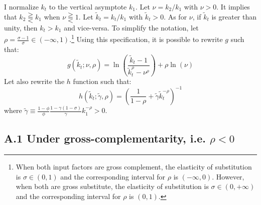 I normalize $k_t$ to the vertical asymptote $k_1$. Let $\nu = k_2/k_1$ with $\nu > 0$. It implies that $k_2 \gtreqqless k_1$ when $\nu \gtreqqless 1$. Let $\tilde{k}_t = k_t / k_1$ with $\tilde{k}_t > 0$. As for $\nu$, if $\tilde{k}_t$ is greater than unity, then $k_t>k_1$ and vice-versa. To simplify the notation, let $\rho = \frac{\sigma-1}{\sigma} \in \left(-\infty, 1\right)$.\footnote{When both input factors are gross complement, the elasticity of substitution is $\sigma \in \left(0,1\right)$ and the corresponding interval for $\rho$ is $\left(-\infty, 0\right)$. However, when both are gross substitute, the elasticity of substitution is $\sigma \in \left(0,+\infty\right)$ and the corresponding interval for $\rho$ is $\left(0,1\right)$.} Using this specification, it is possible to rewrite $g$ such that:
	\begin{equation*}
		g(\tilde{k}_t; \nu, \rho) = \ln\left(\frac{\tilde{k}_t - 1}{\tilde{k}_t^\rho - \nu^\rho}\right) + \rho\ln\left(\nu\right)
	\end{equation*}
Let also rewrite the $h$ function such that:
	\begin{equation*}
		h(\tilde{k}_t ; \tilde{\gamma}, \rho) = \left( \frac{1}{1-\rho} + \tilde{\gamma} \tilde{k}_t^{-\rho} \right)^{-1}
	\end{equation*}
where $\tilde{\gamma} \equiv \frac{1-\phi}{\phi} \frac{1-\gamma(1-\sigma)}{\gamma} k_1^{-\rho}> 0$.

\subsection*{A.1 Under gross-complementarity, i.e. $\rho < 0$}

